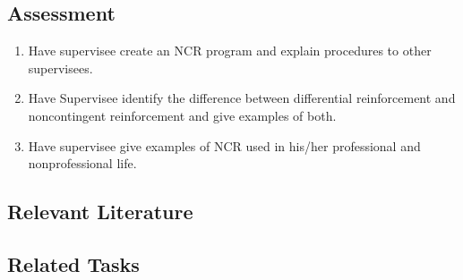 \subsection{Assessment}
\begin{enumerate}
\item Have supervisee create an NCR program and explain procedures to other supervisees.
\item Have Supervisee identify the difference between differential reinforcement and noncontingent reinforcement and give examples of both.
\item Have supervisee give examples of NCR used in his/her professional and nonprofessional life.
\end{enumerate}
%
\subsection{Relevant Literature}
\begin{refsection}
\nocite{cautela1984general,
       cooper2007applied,
       hagopian1994schedule,
       ingvarsson2008some,
       wilder2005noncontingent}
\printbibliography[heading=none]
\end{refsection}
%
\subsection{Related Tasks}
\fourbFour{}\\
\fourcOne{}\\
\fourdTwo{}\\
\fourdTwentyOne{}\\
\fourjTwo{}\\
